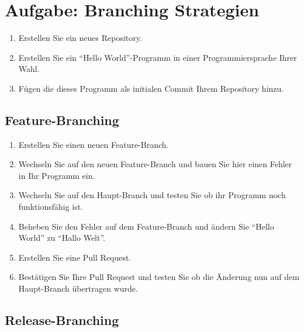 
\section{Aufgabe: Branching Strategien}
\label{sec:task:task-branch}

\begin{enumerate}
    \item Erstellen Sie ein neues Repository.

    \item Erstellen Sie ein \enquote{Hello World}-Programm in einer Programmiersprache Ihrer Wahl.

    \item Fügen die dieses Programm als initialen Commit Ihrem Repository hinzu.

\end{enumerate}

\subsection{Feature\hyp Branching}

\begin{enumerate}
    \item Erstellen Sie einen neuen Feature\hyp Branch.

    \item Wechseln Sie auf den neuen Feature\hyp Branch und bauen Sie hier einen Fehler in Ihr Programm ein.
    
    \item Wechseln Sie auf den Haupt\hyp Branch und testen Sie ob ihr Programm noch funktionsfähig ist.
    
    \item Beheben Sie den Fehler auf dem Feature\hyp Branch und ändern Sie \enquote{Hello World} zu \enquote{Hallo Welt}.
    
    \item Erstellen Sie eine Pull Request.
    
    \item Bestätigen Sie Ihre Pull Request und testen Sie ob die Änderung nun auf dem Haupt\hyp Branch übertragen wurde.
\end{enumerate}

\subsection{Release\hyp Branching}

